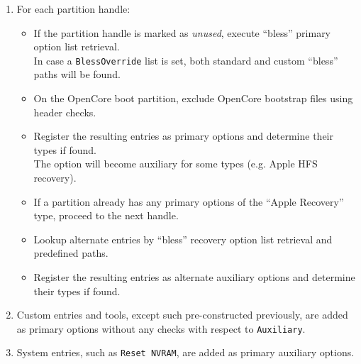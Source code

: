 \documentclass[]{article}
\providecommand{\DIFaddtex}[1]{{\protect\color{blue}\uwave{#1}}} %
\providecommand{\DIFaddbegin}{\global\booltrue{DIFkeeppage}\global\booltrue{DIFchange}} %
\providecommand{\DIFaddend}{\global\booltrue{DIFkeeppage}\global\boolfalse{DIFchange}} %
\providecommand{\DIFadd}[1]{\texorpdfstring{\DIFaddtex{#1}}{#1}} %
\begin{document}
\begin{enumerate}
\item For each partition handle:
  \begin{itemize}
  \item If the partition handle is marked as \textit{unused}, execute ``bless'' primary option list retrieval. \\
    In case a \texttt{BlessOverride} list is set, both standard and custom ``bless'' paths will be found.
  \item On the OpenCore boot partition, exclude OpenCore bootstrap files using header checks.
  \item Register the resulting entries as primary options and determine their types if found. \\
  The option will become auxiliary for some types (e.g. Apple HFS recovery).
  \item If a partition already has any primary options of the ``Apple Recovery'' type, proceed to the next handle.
  \item Lookup alternate entries by ``bless'' recovery option list retrieval and predefined paths.
  \item Register the resulting entries as alternate auxiliary options and determine their types if found.
  \end{itemize}
\item Custom entries and tools, except such pre-constructed previously, are added as primary options
without any checks with respect to \texttt{Auxiliary}.
\item System entries, such as \texttt{Reset NVRAM}, are added as primary auxiliary options.
\end{enumerate}
\end{document}
